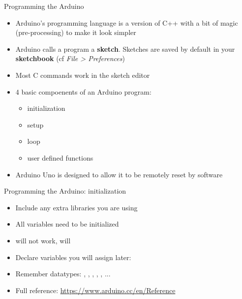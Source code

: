 \documentclass[compress]{beamer}
\begin{document}
    \begin{frame}{Programming the Arduino}
        \begin{itemize}
            \item Arduino's programming language is a version of C++ with a bit
                of magic (pre-processing) to make it look simpler

            \item Arduino calls a program a \textbf{sketch}. Sketches are saved
                by default in your \textbf{sketchbook} (cf \emph{File >
                Preferences})
            \item Most C commands work in the sketch editor
            \item 4 basic compoenents of an Arduino program:
                \begin{itemize}
                    \item initialization
                    \item setup
                    \item loop
                    \item user defined functions
                \end{itemize}
            \item Arduino Uno is designed to allow it to be remotely reset by
                software

        \end{itemize}
    \end{frame}

    \begin{frame}{Programming the Arduino: initialization}
        \begin{itemize}
            \item Include any extra libraries you are using
            \item All variables need to be initialized
            \item {} will not work,  will
            \item Declare variables you will assign later: 
            \item Remember datatypes: , , , , , ...
            \item Full reference: \url{https://www.arduino.cc/en/Reference}
        \end{itemize}
    \end{frame}
\end{document}
